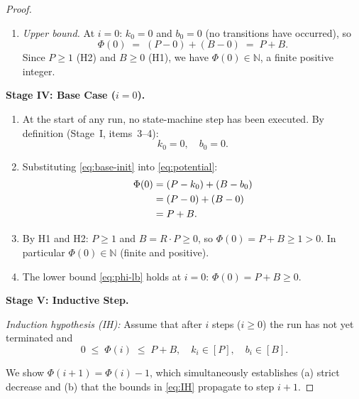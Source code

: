 \documentclass[12pt]{article}
\theoremstyle{definition}
\begin{document}
\begin{proof}
\begin{enumerate}
  \item \emph{Upper bound.}  At $i = 0$: $k_0 = 0$ and $b_0 = 0$
        (no transitions have occurred), so
        \begin{equation}
          \label{eq:phi-ub}
          \Phi(0) \;=\; (P - 0) + (B - 0) \;=\; P + B.
        \end{equation}
        Since $P \geq 1$ (H2) and $B \geq 0$ (H1), we have
        $\Phi(0) \in \mathbb{N}$, a finite positive integer.
\end{enumerate}

\medskip
\noindent\textbf{Stage IV: Base Case ($i = 0$).}

\begin{enumerate}
  \item At the start of any run, no state-machine step has been
        executed.  By definition (Stage~I, items~3--4):
        \begin{equation}
          \label{eq:base-init}
          k_0 = 0, \quad b_0 = 0.
        \end{equation}

  \item Substituting \eqref{eq:base-init} into \eqref{eq:potential}:
        \begin{align}
          \Phi(0)
            &= (P - k_0) + (B - b_0) \notag\\
            &= (P - 0)   + (B - 0)   \notag\\
            &= P + B.     \label{eq:base-val}
        \end{align}

  \item By H1 and H2: $P \geq 1$ and $B = R \cdot P \geq 0$, so
        $\Phi(0) = P + B \geq 1 > 0$.  In particular
        $\Phi(0) \in \mathbb{N}$ (finite and positive).

  \item The lower bound \eqref{eq:phi-lb} holds at $i = 0$:
        $\Phi(0) = P + B \geq 0$. \checkmark
\end{enumerate}

\medskip
\noindent\textbf{Stage V: Inductive Step.}

\noindent\textit{Induction hypothesis (IH):} Assume that after $i$
steps ($i \geq 0$) the run has not yet terminated and
\begin{equation}
\label{eq:IH}
0 \;\leq\; \Phi(i) \;\leq\; P + B, \quad
k_i \in [P], \quad b_i \in [B].
\end{equation}

\noindent We show $\Phi(i+1) = \Phi(i) - 1$, which simultaneously
establishes (a) strict decrease and (b) that the bounds in
\eqref{eq:IH} propagate to step $i+1$.


\end{proof}
\end{document}

